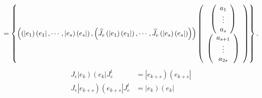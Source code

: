 \documentclass[aps,preprint]{revtex4}%
\begin{document}
\begin{equation}
=\left\{  \left(  \left(  \left\vert e_{1}\right)  \left(  e_{1}\right\vert
,\cdots,\left\vert e_{s}\right)  \left(  e_{s}\right\vert \right)  ,\left(
\widehat{J_{e}}\left(  \left\vert e_{1}\right)  \left(  e_{1}\right\vert
\right)  ,\cdots,\widehat{J_{e}}\left(  \left\vert e_{s}\right)  \left(
e_{s}\right\vert \right)  \right)  \right)  \left(
\begin{array}
[c]{c}%
\left(
\begin{array}
[c]{c}%
a_{1}\\
\vdots\\
a_{s}%
\end{array}
\right) \\
\left(
\begin{array}
[c]{c}%
a_{s+1}\\
\vdots\\
a_{2s}%
\end{array}
\right)
\end{array}
\right)  \right\}  .
\end{equation}%
\begin{align}
J_{e}\left\vert e_{k}\right)  \left(  e_{k}\right\vert J_{e}^{t}  &
=\left\vert e_{k+s}\right)  \left(  e_{k+s}\right\vert \\
J_{e}\left\vert e_{k+s}\right)  \left(  e_{k+s}\right\vert J_{e}^{t}  &
=\left\vert e_{k}\right)  \left(  e_{k}\right\vert
\end{align}


\bigskip

\bigskip

\bigskip%
\end{document}
